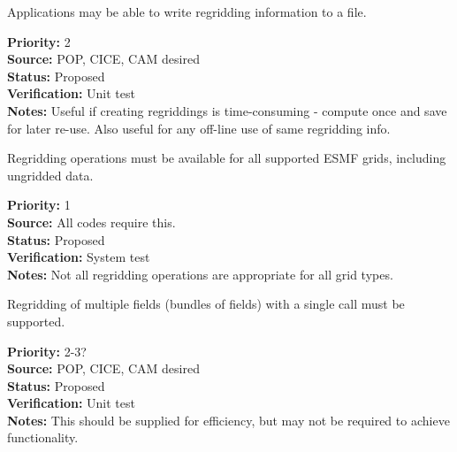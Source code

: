 
Applications may be able to write regridding information to a file.

\begin{reqlist}
{\bf Priority:} 2 \\
{\bf Source:} POP, CICE, CAM desired \\
{\bf Status:} Proposed \\
{\bf Verification:} Unit test \\
{\bf Notes:} Useful if creating regriddings is time-consuming - compute once
             and save for later re-use.  Also useful for any off-line
             use of same regridding info.
\end{reqlist}


Regridding operations must be available for all supported ESMF grids,
including ungridded data.

\begin{reqlist}
{\bf Priority:} 1 \\
{\bf Source:} All codes require this. \\
{\bf Status:} Proposed \\
{\bf Verification:} System test \\
{\bf Notes:} Not all regridding operations are appropriate for all
             grid types.
\end{reqlist}


Regridding of multiple fields (bundles of fields) with
a single call must be supported.

\begin{reqlist}
{\bf Priority:} 2-3? \\
{\bf Source:} POP, CICE, CAM desired \\
{\bf Status:} Proposed \\
{\bf Verification:} Unit test \\
{\bf Notes:} This should be supplied for efficiency, but may not
             be required to achieve functionality.
\end{reqlist}


